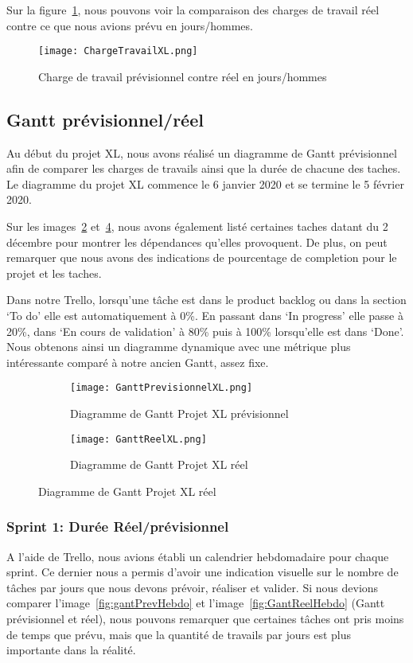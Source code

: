 Sur la figure~\ref{fig:chargeReel}, nous pouvons voir la comparaison des charges de travail réel contre ce que nous avions prévu en jours/hommes.

\begin{figure}[h!]
  \centering
  \texttt{[image: ChargeTravailXL.png]}
	\caption[]{Charge de travail prévisionnel contre réel en jours/hommes}
	\label{fig:chargeReel}
\end{figure}



\subsection{Gantt prévisionnel/réel}
Au début du projet XL, nous avons réalisé un diagramme de Gantt prévisionnel afin de comparer les charges de travails ainsi que la durée de chacune des taches.
Le diagramme du projet XL commence le 6 janvier 2020 et se termine le 5 février 2020. 

Sur les images~\ref{fig:gantXLprev} et~\ref{fig:gantXLreel}, nous avons également listé certaines taches datant du 2 décembre pour montrer les dépendances qu'elles provoquent.
De plus, on peut remarquer que nous avons des indications de pourcentage de completion pour le projet et les taches.

Dans notre Trello, lorsqu'une tâche est dans le product backlog ou dans la section `To do' elle est automatiquement à 0\%.
En passant dans `In progress' elle passe à 20\%, dans `En cours de validation' à 80\% puis à 100\% lorsqu'elle est dans `Done'.
Nous obtenons ainsi un diagramme dynamique avec une métrique plus intéressante comparé à notre ancien Gantt, assez fixe.

\begin{figure}
   \centering
   \begin{subfigure}{.5\textwidth}
     \centering
     \texttt{[image: GanttPrevisionnelXL.png]}
   	\caption{Diagramme de Gantt Projet XL prévisionnel}
   	\label{fig:gantXLprev}
   \end{subfigure}%
   \begin{subfigure}{.5\textwidth}
     \centering
     \texttt{[image: GanttReelXL.png]}
   	\caption{Diagramme de Gantt Projet XL réel}
   	\label{fig:gantXLreel}
   \end{subfigure}
\end{figure}

\subsubsection{Sprint 1: Durée Réel/prévisionnel}
A l'aide de Trello, nous avions établi un calendrier hebdomadaire pour chaque sprint.
Ce dernier nous a permis d’avoir une indication visuelle sur le nombre de tâches par jours que nous devons prévoir, réaliser et valider.
Si nous devions comparer l'image~\ref{fig:gantPrevHebdo} et l'image~\ref{fig:GantReelHebdo} (Gantt prévisionnel et réel), nous pouvons remarquer que certaines tâches ont pris moins de temps que prévu, mais que la quantité de travails par jours est plus importante dans la réalité.

